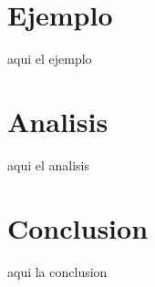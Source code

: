 \documentclass[preprint,12pt]{elsarticle}
\begin{document}

	

\section{Ejemplo}
	

aqui el ejemplo





\section{Analisis}
	

aqui el analisis

\newpage

	
	
\section{Conclusion}
aqui la conclusion

	
	

	
	
	\newpage
	
	
	
	
	
	
	
	
	
	
	
	
	
	
\end{document}
